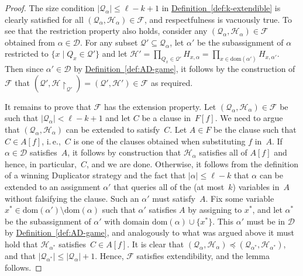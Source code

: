\documentclass[11pt]{article}
\numberwithin{equation}{section}
\theoremstyle{definition}
\theoremstyle{plain}
\newcommand{\ie}{i.\,e.}
\newcommand{\expref}[2]{\hyperref[#2]{#1~\ref{#2}}}
\theoremstyle{plain}
\theoremstyle{definition}
\newcommand{\refdef}[1]{\expref{Definition}{#1}}
\newcommand{\domainof}[1]{\ensuremath{\mathrm{dom} ( #1 )}}
\newcommand{\set}[1]{\{ #1 \}}
\newcommand{\setdescr}[3][\mid]{\set{ #2 #1 #3 }}
\newcommand{\setsize}[1]{\lvert#1\rvert}
\newcommand{\union}{\cup}
\newcommand{\ieComma}{\ie,\ }
\newcommand{\restrict}[2]{{{#1}\!\!\upharpoonright_{#2}}}
\newcommand{\substform}[2]{{#1}[{#2}]}
\newcommand{\partitionnot}{\mathcal{Q}}
\newcommand{\assignmentsetnot}{\mathcal{H}}
\newcommand{\structuredassignmentsnot}[1][]{(\partitionnot #1,\assignmentsetnot #1)}
\newcommand{\kextendfamily}{\ensuremath{\mathcal{F}}\xspace}
\newcommand{\respectfulness}{respectfulness\xspace}
\newcommand{\restrictionproperty}{restriction property\xspace}
\newcommand{\extensionproperty}{extension property\xspace}
\newcommand{\extensionpropname}{extendibility\xspace}
\newcommand{\formulakwidth}{k}
\newcommand{\adpebblenumber}{\ell}
\newcommand{\adduplicatorfamily}{\mathcal{D}}
\begin{document}
\begin{proof}
  The size condition
  $\setsize{\partitionnot_\alpha} \leq  \adpebblenumber - \formulakwidth + 1$ 
  in
 \refdef{def:k-extendible}
  is clearly satisfied for all
  $\structuredassignmentsnot[_\alpha] \in \kextendfamily$, 
  and \respectfulness is vacuously true.
  To see that the \restrictionproperty{} also holds,
%
%
%
  consider any
  \mbox{$\structuredassignmentsnot[_\alpha] \in \kextendfamily$} 
  obtained from $\alpha \in \adduplicatorfamily$.
  For any subset 
  $\partitionnot' \subseteq \partitionnot_\alpha$, 
  let
  $\alpha'$
  be the subassignment of 
  $\alpha$
  restricted to 
  $\setdescr{x}{Q_x \in \partitionnot'}$
%
  and let
  $
  \assignmentsetnot' = 
  \prod_{Q_x \in \partitionnot'} H_{x,\alpha} =
  \prod_{x \in \domainof{\alpha'}} H_{x,\alpha'}
  $.
  Then since
  $\alpha' \in \adduplicatorfamily$
  by
 \refdef{def:AD-game},  
  it follows by the construction of~$\kextendfamily$
  that
  $
  (\partitionnot', \restrict{\assignmentsetnot}{\partitionnot'})
  =
  \structuredassignmentsnot[']
  \in
  \kextendfamily$
  as required.
%
%
%
%
%
%
%
%
%
%
%
%


  It 
%
  remains to prove that $\kextendfamily$ has the
  \extensionproperty{}. 
%
%
%
%
%
%
%
  Let $\structuredassignmentsnot[_\alpha] \in \kextendfamily$ be 
  such that
  $\setsize{\partitionnot_\alpha} < \adpebblenumber - \formulakwidth + 1$ 
  and
%
  let 
  $C$ be a clause in~$\substform{F}{f}$.
  We need to argue that 
  $\structuredassignmentsnot[_\alpha]$
  can be extended to satisfy~$C$.
%
  Let 
  $A \in F$
  be the clause such that
  $C \in \substform{A}{f}$,
  \ieComma $C$ is one of the clauses
  obtained when substituting
%
  $f$ in~$A$. 
  If
  $\alpha \in \adduplicatorfamily$ 
  satisfies~$A$, it follows by construction that 
  $\assignmentsetnot_\alpha$
  satisfies all of 
  $\substform{A}{f}$ 
  and hence, in particular,~$C$, and we are done.
  Otherwise, 
%
%
%
%
%
%
%
%
  it follows
  from the definition 
  of a winning Duplicator strategy and the
  fact that $\setsize{\alpha} \leq \adpebblenumber - \formulakwidth$
  that $\alpha$ can be extended to an assignment $\alpha'$
%
%
%
  that queries all of the (at most~$\formulakwidth$) variables in~$A$ 
  without falsifying the clause. Such an $\alpha'$ must satisfy~$A$.
  Fix some variable
  $x^* \in \domainof{\alpha'} \setminus \domainof{\alpha}$
  such that $\alpha'$ satisfies $A$ by assigning to $x^*$,
  and let
  $\alpha^*$ be the subassignment of $\alpha'$
  with domain
  $\domainof{\alpha} \union \set{x^*}$.
%
%
%
%
%
%
%
%
%
%
%
%
%
%
%
  This $\alpha'$ must be in $\adduplicatorfamily$ by
 \refdef{def:AD-game},  
  and analogously to what was argued above it must hold that
  $\assignmentsetnot_{\alpha^*}$
  satisfies~$C \in \substform{A}{f}$.
  It is clear that
  $\structuredassignmentsnot[_{\alpha}] 
  \preccurlyeq 
  \structuredassignmentsnot[_{\alpha^*}]$,
  and that
  $\setsize{\partitionnot_{\alpha^*}} \leq
  \setsize{\partitionnot_\alpha} + 1$.
  Hence, 
  $\kextendfamily$ satisfies
  \extensionpropname, and the lemma follows.
\end{proof}
\end{document}
